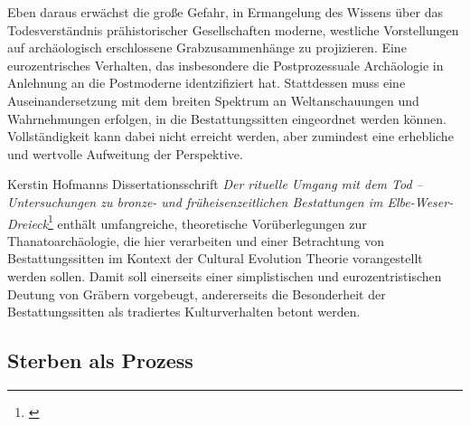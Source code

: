 \documentclass[openany,twoside,twocolumn]{book}
\let\rmarkdownfootnote\footnote%
\def\footnote{\protect\rmarkdownfootnote}
\begin{document}
Eben daraus erwächst die große Gefahr, in Ermangelung des Wissens über
das Todesverständnis prähistorischer Gesellschaften moderne, westliche
Vorstellungen auf archäologisch erschlossene Grabzusammenhänge zu
projizieren. Eine eurozentrisches Verhalten, das insbesondere die
Postprozessuale Archäologie in Anlehnung an die Postmoderne
identzifiziert hat. Stattdessen muss eine Auseinandersetzung mit dem
breiten Spektrum an Weltanschauungen und Wahrnehmungen erfolgen, in die
Bestattungssitten eingeordnet werden können. Vollständigkeit kann dabei
nicht erreicht werden, aber zumindest eine erhebliche und wertvolle
Aufweitung der Perspektive.

Kerstin Hofmanns Dissertationsschrift \emph{Der rituelle Umgang mit dem
Tod -- Untersuchungen zu bronze- und früheisenzeitlichen Bestattungen im
Elbe-Weser-Dreieck}\footnote{\textcite{hofmann_rituelle_2008}} enthält
umfangreiche, theoretische Vorüberlegungen zur Thanatoarchäologie, die
hier verarbeiten und einer Betrachtung von Bestattungssitten im Kontext
der Cultural Evolution Theorie vorangestellt werden sollen. Damit soll
einerseits einer simplistischen und eurozentristischen Deutung von
Gräbern vorgebeugt, andererseits die Besonderheit der Bestattungssitten
als tradiertes Kulturverhalten betont werden.

\hypertarget{sterben-als-prozess}{%
\subsection{Sterben als Prozess}\label{sterben-als-prozess}}
\end{document}
